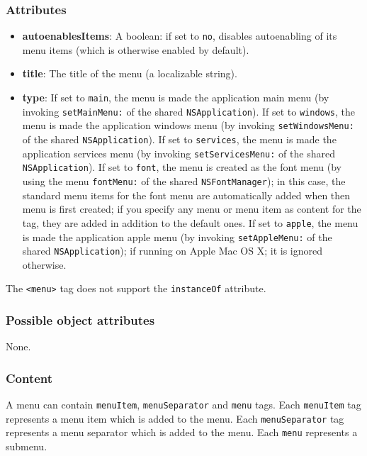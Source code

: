 \subsubsection{Attributes}
\begin{itemize}
\item {\bf autoenablesItems}: A boolean: if set to \texttt{no},
  disables autoenabling of its menu items (which is otherwise enabled
  by default).
\item {\bf title}: The title of the menu (a localizable string).
\item {\bf type}: If set to \texttt{main}, the menu is made the
  application main menu (by invoking \texttt{setMainMenu:} of the
  shared \texttt{NSApplication}).  If set to \texttt{windows}, the
  menu is made the application windows menu (by invoking
  \texttt{setWindowsMenu:} of the shared \texttt{NSApplication}).  If
  set to \texttt{services}, the menu is made the application services
  menu (by invoking \texttt{setServicesMenu:} of the shared
  \texttt{NSApplication}).  If set to \texttt{font}, the menu is
  created as the font menu (by using the menu \texttt{fontMenu:} of
  the shared \texttt{NSFontManager}); in this case, the standard menu
  items for the font menu are automatically added when then menu is
  first created; if you specify any menu or menu item as content for
  the tag, they are added in addition to the default ones.  If set to
  \texttt{apple}, the menu is made the application apple menu (by
  invoking \texttt{setAppleMenu:} of the shared
  \texttt{NSApplication}); if running on Apple Mac OS X; it is ignored
  otherwise.
\end{itemize}

The \texttt{<menu>} tag does not support the \texttt{instanceOf} attribute.

\subsubsection{Possible object attributes}
None.

\subsubsection{Content}
A menu can contain \texttt{menuItem}, \texttt{menuSeparator} and
\texttt{menu} tags.  Each \texttt{menuItem} tag represents a menu item
which is added to the menu.  Each \texttt{menuSeparator} tag
represents a menu separator which is added to the menu.  Each
\texttt{menu} represents a submenu.

